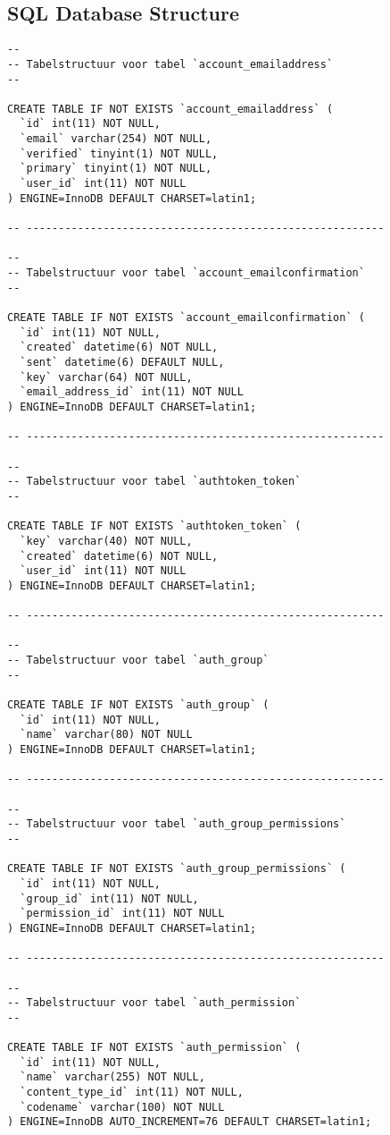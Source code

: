 \documentclass[11pt]{article}
\begin{document}
\subsection{SQL Database Structure}
\begin{lstlisting}[style=SQL]
--
-- Tabelstructuur voor tabel `account_emailaddress`
--

CREATE TABLE IF NOT EXISTS `account_emailaddress` (
  `id` int(11) NOT NULL,
  `email` varchar(254) NOT NULL,
  `verified` tinyint(1) NOT NULL,
  `primary` tinyint(1) NOT NULL,
  `user_id` int(11) NOT NULL
) ENGINE=InnoDB DEFAULT CHARSET=latin1;

-- --------------------------------------------------------

--
-- Tabelstructuur voor tabel `account_emailconfirmation`
--

CREATE TABLE IF NOT EXISTS `account_emailconfirmation` (
  `id` int(11) NOT NULL,
  `created` datetime(6) NOT NULL,
  `sent` datetime(6) DEFAULT NULL,
  `key` varchar(64) NOT NULL,
  `email_address_id` int(11) NOT NULL
) ENGINE=InnoDB DEFAULT CHARSET=latin1;

-- --------------------------------------------------------

--
-- Tabelstructuur voor tabel `authtoken_token`
--

CREATE TABLE IF NOT EXISTS `authtoken_token` (
  `key` varchar(40) NOT NULL,
  `created` datetime(6) NOT NULL,
  `user_id` int(11) NOT NULL
) ENGINE=InnoDB DEFAULT CHARSET=latin1;

-- --------------------------------------------------------

--
-- Tabelstructuur voor tabel `auth_group`
--

CREATE TABLE IF NOT EXISTS `auth_group` (
  `id` int(11) NOT NULL,
  `name` varchar(80) NOT NULL
) ENGINE=InnoDB DEFAULT CHARSET=latin1;

-- --------------------------------------------------------

--
-- Tabelstructuur voor tabel `auth_group_permissions`
--

CREATE TABLE IF NOT EXISTS `auth_group_permissions` (
  `id` int(11) NOT NULL,
  `group_id` int(11) NOT NULL,
  `permission_id` int(11) NOT NULL
) ENGINE=InnoDB DEFAULT CHARSET=latin1;

-- --------------------------------------------------------

--
-- Tabelstructuur voor tabel `auth_permission`
--

CREATE TABLE IF NOT EXISTS `auth_permission` (
  `id` int(11) NOT NULL,
  `name` varchar(255) NOT NULL,
  `content_type_id` int(11) NOT NULL,
  `codename` varchar(100) NOT NULL
) ENGINE=InnoDB AUTO_INCREMENT=76 DEFAULT CHARSET=latin1;


\end{lstlisting}
\end{document}
